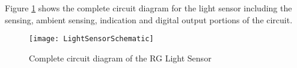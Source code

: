 \begin{homeworkProblem}
Figure \ref{schematic1} shows the complete circuit diagram for the light sensor including the sensing, ambient sensing, indication and digital output portions of the circuit.

\begin{figure}[H]
  \begin{center}
    \texttt{[image: LightSensorSchematic]}
    \caption{Complete circuit diagram of the RG Light Sensor}
    \label{schematic1}
  \end{center}
\end{figure}


\end{homeworkProblem}


